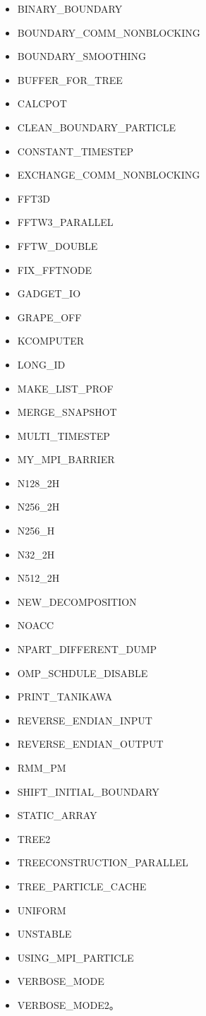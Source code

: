\begin{itemize}
\item BINARY\_BOUNDARY
\item BOUNDARY\_COMM\_NONBLOCKING
\item BOUNDARY\_SMOOTHING
\item BUFFER\_FOR\_TREE
\item CALCPOT
\item CLEAN\_BOUNDARY\_PARTICLE
\item CONSTANT\_TIMESTEP
\item EXCHANGE\_COMM\_NONBLOCKING
\item FFT3D
\item FFTW3\_PARALLEL
\item FFTW\_DOUBLE
\item FIX\_FFTNODE
\item GADGET\_IO
\item GRAPE\_OFF
\item KCOMPUTER
\item LONG\_ID
\item MAKE\_LIST\_PROF
\item MERGE\_SNAPSHOT
\item MULTI\_TIMESTEP
\item MY\_MPI\_BARRIER
\item N128\_2H
\item N256\_2H
\item N256\_H
\item N32\_2H
\item N512\_2H
\item NEW\_DECOMPOSITION
\item NOACC
\item NPART\_DIFFERENT\_DUMP
\item OMP\_SCHDULE\_DISABLE
\item PRINT\_TANIKAWA
\item REVERSE\_ENDIAN\_INPUT
\item REVERSE\_ENDIAN\_OUTPUT
\item RMM\_PM
\item SHIFT\_INITIAL\_BOUNDARY
\item STATIC\_ARRAY
\item TREE2
\item TREECONSTRUCTION\_PARALLEL
\item TREE\_PARTICLE\_CACHE
\item UNIFORM
\item UNSTABLE
\item USING\_MPI\_PARTICLE
\item VERBOSE\_MODE
\item VERBOSE\_MODE2。
\end{itemize}

